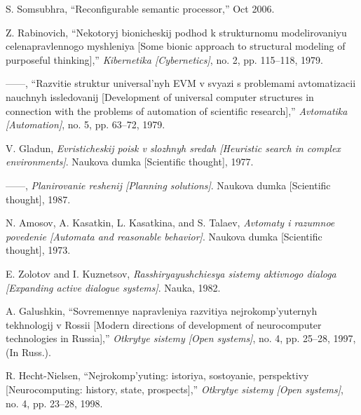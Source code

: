 \documentclass{article}
\begin{document}
{\begin{multicols}{2}
{\begin{enumerate}[label={[\arabic*]}]
    \item S. Somsubhra, “Reconfigurable semantic processor,” Oct 2006.
    
    \item Z. Rabinovich, “Nekotoryj bionicheskij podhod k strukturnomu
modelirovaniyu celenapravlennogo myshleniya [Some bionic approach to structural modeling of purposeful thinking],” \textit{Kibernetika
[Cybernetics]}, no. 2, pp. 115–118, 1979.

    \item ——, “Razvitie struktur universal’nyh EVM v svyazi s problemami
avtomatizacii nauchnyh issledovanij [Development of universal
computer structures in connection with the problems of automation
of scientific research],” \textit{Avtomatika [Automation]}, no. 5, pp. 63–72,
1979.
    \item V. Gladun, \textit{Evristicheskij poisk v slozhnyh sredah [Heuristic search
in complex environments]}. Naukova dumka [Scientific thought],
1977.
    \item ——, \textit{Planirovanie reshenij [Planning solutions]}. Naukova dumka
[Scientific thought], 1987.
    \item N. Amosov, A. Kasatkin, L. Kasatkina, and S. Talaev, \textit{Avtomaty
i razumnoe povedenie [Automata and reasonable behavior]}.
Naukova dumka [Scientific thought], 1973.

    \item E. Zolotov and I. Kuznetsov, \textit{Rasshiryayushchiesya sistemy
aktivnogo dialoga [Expanding active dialogue systems]}. Nauka,
1982.
    \item A. Galushkin, “Sovremennye napravleniya razvitiya
nejrokomp’yuternyh tekhnologij v Rossii [Modern directions of
development of neurocomputer technologies in Russia],” \textit{Otkrytye
sistemy [Open systems]}, no. 4, pp. 25–28, 1997, (In Russ.).
    \item R. Hecht-Nielsen, “Nejrokomp’yuting: istoriya, sostoyanie, perspektivy [Neurocomputing: history, state, prospects],” \textit{Otkrytye
sistemy [Open systems]}, no. 4, pp. 23–28, 1998.


\end{enumerate}}
\end{multicols}}
\end{document}
